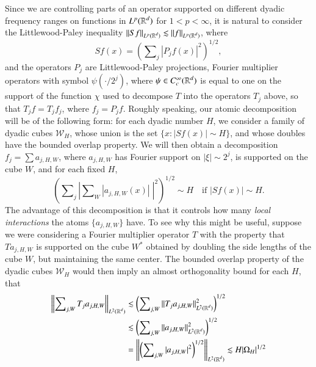 Since we are controlling parts of an operator supported on different dyadic frequency ranges on functions in $L^p(\operatorname{\mathbb{R}}^d)$ for $1 < p < \infty$, it is natural to consider the Littlewood-Paley inequality $\| Sf \|_{L^p(\operatorname{\mathbb{R}}^d)} \lesssim \| f \|_{L^p(\operatorname{\mathbb{R}}^d)}$, where
%
\begin{equation}
  Sf(x) = \left( \sum\nolimits_j |P_j f(x)|^2 \right)^{1/2},
\end{equation}
%
and the operators $P_j$ are Littlewood-Paley projections, Fourier multiplier operators with symbol $\psi(\cdot / 2^j)$, where $\psi \in C_c^\infty(\operatorname{\mathbb{R}}^d)$ is equal to one on the support of the function $\chi$ used to decompose $T$ into the operators $T_j$ above, so that $T_j f = T_j f_j$, where $f_j = P_j f$. Roughly speaking, our atomic decomposition will be of the following form: for each dyadic number $H$, we consider a family of dyadic cubes $\mathcal{W}_H$, whose union is the set $\{ x : |Sf(x)| \sim H \}$, and whose doubles have the bounded overlap property. We will then obtain a decomposition $f_j = \sum a_{j,H,W}$, where $a_{j,H,W}$ has Fourier support on $|\xi| \sim 2^j$, is supported on the cube $W$, and for each fixed $H$,
%
\begin{equation}
  \left( \sum\nolimits_j \left|\sum\nolimits_W |a_{j,H,W}(x)|\; \right|^2 \right)^{1/2} \sim H \quad\text{if $|Sf(x)| \sim H$}.
\end{equation}
%
The advantage of this decomposition is that it controls how many \emph{local interactions} the atoms $\{ a_{j,H,W} \}$ have. To see why this might be useful, suppose we were considering a Fourier multiplier operator $T$ with the property that $T a_{j,H,W}$ is supported on the cube $W^*$ obtained by doubling the side lengths of the cube $W$, but maintaining the same center. The bounded overlap property of the dyadic cubes $\mathcal{W}_H$ would then imply an almost orthogonality bound for each $H$, that
%
\begin{equation}
\begin{split}
  \left\| \sum\nolimits_{j,W} T_j a_{j,H,W} \right\|_{L^2(\operatorname{\mathbb{R}}^d)} &\lesssim \left( \sum\nolimits_{j,W} \| T_j a_{j,H,W} \|_{L^2(\operatorname{\mathbb{R}}^d)}^2 \right)^{1/2}\\
  &\lesssim \left( \sum\nolimits_{j,W} \| a_{j,H,W} \|_{L^2(\operatorname{\mathbb{R}}^d)}^2 \right)^{1/2}\\
  &= \left\| \left( \sum\nolimits_{j,W} |a_{j,H,W}|^2 \right)^{1/2} \right\|_{L^2(\operatorname{\mathbb{R}}^d)} \lesssim H |\Omega_H|^{1/2}
\end{split}
\end{equation}
